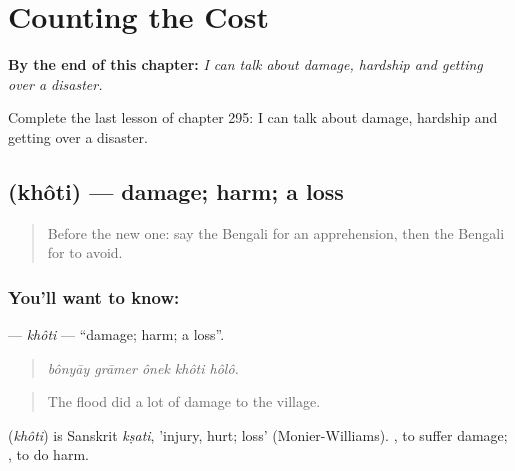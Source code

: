 
\chapter{Counting the Cost}
\label{ch:bn-counting-the-cost}

\begin{chapteropening}
\textbf{By the end of this chapter:} \emph{I can talk about damage, hardship and getting over a disaster.}

Complete the last lesson of chapter 295: I can talk about damage, hardship and getting over a disaster.
\end{chapteropening}

\section[\texorpdfstring{\bn{ক্ষতি} (khôti)}{ক্ষতি (khôti)}]{ (khôti) — damage; harm; a loss}

\label{lesson:BN-C295-khoti}



\begin{quote}
Before the new one: say the Bengali for an apprehension, then the Bengali for to avoid.
\end{quote}

\subsection*{You'll want to know: }
\textbf{} — \emph{khôti} — \textquotedblleft{}damage; harm; a loss\textquotedblright{}.

\begin{quote}
    
\end{quote}

\begin{quote}
\emph{bônyāy grāmer ônek khôti hôlô.}
\end{quote}

\begin{quote}
The flood did a lot of damage to the village.
\end{quote}

\begin{cousinweb}
\textbf{} (\emph{khôti}) is Sanskrit \emph{kṣati}, 'injury, hurt; loss' (Monier-Williams).  , to suffer damage;  , to do harm.
\end{cousinweb}

